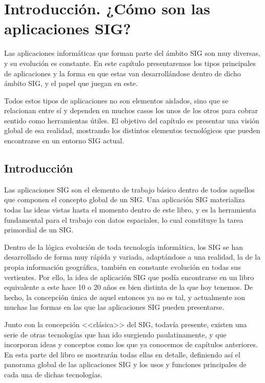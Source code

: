 
\chapter{Introducción. ¿Cómo son las aplicaciones SIG?}
\label{Introduccion_tecnologia}


\bigskip

\begin{intro}
Las aplicaciones informáticas que forman parte del ámbito SIG son muy diversas, y su evolución es constante. En este capítulo presentaremos los tipos principales de aplicaciones y la forma en que estas van desarrollándose dentro de dicho ámbito SIG, y el papel que juegan en este. 

Todos estos tipos de aplicaciones no son elementos aislados, sino que se relacionan entre sí y dependen en muchos casos los unos de los otros para cobrar sentido como herramientas útiles. El objetivo del capítulo es presentar una visión global de esa realidad, mostrando los distintos elementos tecnológicos que pueden encontrarse en un entorno SIG actual.
\end{intro}

\section{Introducción}
\pagestyle{fancy}

Las aplicaciones SIG son el elemento de trabajo básico dentro de todos aquellos que componen el concepto global de un SIG. Una aplicación SIG materializa todas las ideas vistas hasta el momento dentro de este libro, y es la herramienta fundamental para el trabajo con datos espaciales, lo cual constituye la tarea primordial de un SIG.

Dentro de la lógica evolución de toda tecnología informática, los SIG se han desarrollado de forma muy rápida y variada, adaptándose a una realidad, la de la propia información geográfica, también en constante evolución en todas sus vertientes. Por ello, la idea de aplicación SIG que podía encontrarse en un libro equivalente a este hace 10 o 20 años es bien distinta de la que hoy tenemos. De hecho, la concepción única de aquel entonces ya no es tal, y actualmente son muchas las formas en las que las aplicaciones SIG pueden presentarse.

Junto con la concepción <<clásica>> del SIG, todavía presente, existen una serie de otras tecnologías que han ido surgiendo paulatinamente, y que incorporan ideas y conceptos como los que ya conocemos de capítulos anteriores. En esta parte del libro se mostrarán todas ellas en detalle, definiendo así el panorama global de las aplicaciones SIG y los usos y funciones principales de cada una de dichas tecnologías.

